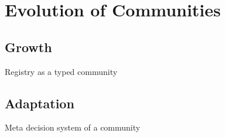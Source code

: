 
\section{Evolution of Communities}

\subsection{Growth}
Registry as a typed community

\subsection{Adaptation}    
Meta decision system of a community